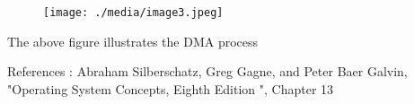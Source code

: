 \documentclass[12pt]{article}
\begin{document}

\begin{figure}[H]
	\begin{Center}
		\texttt{[image: ./media/image3.jpeg]}
	\end{Center}
\end{figure}



\begin{adjustwidth}{0.5in}{0.0in}
The above figure illustrates the DMA process\par

\end{adjustwidth}

\begin{adjustwidth}{0.5in}{0.0in}
{\fontsize{13pt}{15.6pt}\selectfont References : Abraham Silberschatz, Greg Gagne, and Peter Baer Galvin, "Operating System Concepts, Eighth Edition ", Chapter 13\par}\par

\end{adjustwidth}


\vspace{\baselineskip}

\vspace{\baselineskip}

\printbibliography
\end{document}

